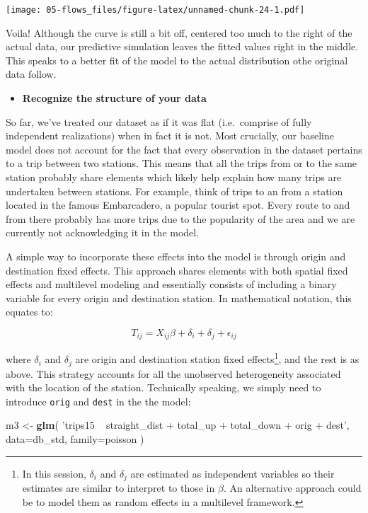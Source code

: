 \documentclass[
]{book}
\newenvironment{Shaded}{\begin{snugshade}}{\end{snugshade}}
\newcommand{\DataTypeTok}[1]{\textcolor[rgb]{0.13,0.29,0.53}{#1}}
\newcommand{\KeywordTok}[1]{\textcolor[rgb]{0.13,0.29,0.53}{\textbf{#1}}}
\newcommand{\NormalTok}[1]{#1}
\newcommand{\StringTok}[1]{\textcolor[rgb]{0.31,0.60,0.02}{#1}}
\providecommand{\tightlist}{%
  \setlength{\itemsep}{0pt}\setlength{\parskip}{0pt}}
\begin{document}
\texttt{[image: 05-flows\_files/figure-latex/unnamed-chunk-24-1.pdf]}

Voila! Although the curve is still a bit off, centered too much to the right of the actual data, our predictive simulation leaves the fitted values right in the middle. This speaks to a better fit of the model to the actual distribution othe original data follow.

\begin{itemize}
\tightlist
\item
  \textbf{Recognize the structure of your data}
\end{itemize}

So far, we've treated our dataset as if it was flat (i.e.~comprise of fully independent realizations) when in fact it is not. Most crucially, our baseline model does not account for the fact that every observation in the dataset pertains to a trip between two stations. This means that all the trips from or to the same station probably share elements which likely help explain how many trips are undertaken between stations. For example, think of trips to an from a station located in the famous Embarcadero, a popular tourist spot. Every route to and from there probably has more trips due to the popularity of the area and we are currently not acknowledging it in the model.

A simple way to incorporate these effects into the model is through origin and destination fixed effects. This approach shares elements with both spatial fixed effects and multilevel modeling and essentially consists of including a binary variable for every origin and destination station. In mathematical notation, this equates to:

\[
T_{ij} = X_{ij}\beta + \delta_i + \delta_j + \epsilon_{ij}
\]

where \(\delta_i\) and \(\delta_j\) are origin and destination station fixed effects\footnote{In this session, \(\delta_i\) and \(\delta_j\) are estimated as independent variables so their estimates are similar to interpret to those in \(\beta\). An alternative approach could be to model them as random effects in a multilevel framework.}, and the rest is as above. This strategy accounts for all the unobserved heterogeneity associated with the location of the station. Technically speaking, we simply need to introduce \texttt{orig} and \texttt{dest} in the the model:

\begin{Shaded}
\begin{Highlighting}[]
\NormalTok{m3 <-}\StringTok{ }\KeywordTok{glm}\NormalTok{(}
  \StringTok{'trips15 ~ straight_dist + total_up + total_down + orig + dest'}\NormalTok{, }
  \DataTypeTok{data=}\NormalTok{db_std,}
  \DataTypeTok{family=}\NormalTok{poisson}
\NormalTok{)}
\end{Highlighting}
\end{Shaded}
\end{document}
